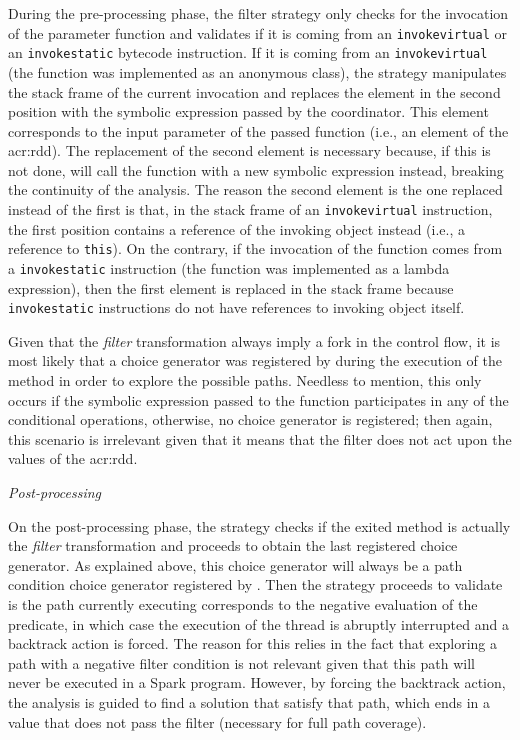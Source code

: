 During the pre-processing phase, the filter strategy only checks for the invocation of the parameter function and validates if it is coming from an \texttt{invokevirtual} or an \texttt{invokestatic} bytecode instruction. If it is coming from an \texttt{invokevirtual} (the function was implemented as an anonymous class), the strategy manipulates the stack frame of the current invocation and replaces the element in the second position with the symbolic expression passed by the coordinator. This element corresponds to the input parameter of the passed function (i.e., an element of the \acrshort{acr:rdd}). The replacement of the second element is necessary because, if this is not done, \spf{} will call the function with a new symbolic expression instead, breaking the continuity of the analysis. The reason the second element is the one replaced instead of the first is that, in the stack frame of an \texttt{invokevirtual} instruction, the first position contains a reference of the invoking object instead (i.e., a reference to \texttt{this}). On the contrary, if the invocation of the function comes from a \texttt{invokestatic} instruction (the function was implemented as a lambda expression), then the first element is replaced in the stack frame because \texttt{invokestatic} instructions do not have references to invoking object itself.

Given that the \textit{filter} transformation always imply a fork in the control flow, it is most likely that a choice generator was registered by \spf{}
during the execution of the method in order to explore the possible paths. Needless to mention, this only occurs if the symbolic expression passed to the function participates in any of the conditional operations, otherwise, no choice generator is registered; then again, this scenario is irrelevant given that it means that the filter does not act upon the values of the \acrshort{acr:rdd}.

\textit{Post-processing}

On the post-processing phase, the strategy checks if the exited method is actually the \textit{filter} transformation and proceeds to obtain the last registered choice generator. As explained above, this choice generator will always be a path condition choice generator registered by \spf{}. Then the strategy proceeds to validate is the path currently executing corresponds to the negative evaluation of the predicate, in which case the execution of the thread is abruptly interrupted and a backtrack action is forced. The reason for this relies in the fact that exploring a path with a negative filter condition is not relevant given that this path will never be executed in a Spark program. However, by forcing the backtrack action, the analysis is guided to find a solution that satisfy that path, which ends in a value that does not pass the filter (necessary for full path coverage).

